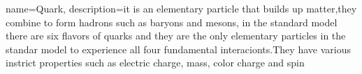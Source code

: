 {
    name=Quark,
    description={it is an elementary particle that builds up matter,they combine to form hadrons such as baryons and mesons, in the standard model there are six flavors of quarks and they are the only elementary particles in the standar model to experience all four fundamental interacionts.They have various instrict properties such as electric charge, mass, color charge and spin}
} 
